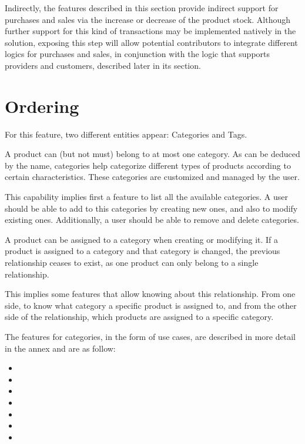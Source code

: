 Indirectly, the features described in this section provide indirect support for purchases and sales via the increase or decrease of the product stock. Although further support for this kind of transactions may be implemented natively in the solution, exposing this step will allow potential contributors to integrate different logics for purchases and sales, in conjunction with the logic that supports providers and customers, described later in its section.

\section{Ordering}
For this feature, two different entities appear: Categories and Tags. 

A product can (but not must) belong to at most one category. As can be deduced by the name, categories help categorize different types of products according to certain characteristics. These categories are customized and managed by the user.

This capability implies first a feature to list all the available categories. A user should be able to add to this categories by creating new ones, and also to modify existing ones. Additionally, a user should be able to remove and delete categories.

A product can be assigned to a category when creating or modifying it. If a product is assigned to a category and that category is changed, the previous relationship ceases to exist, as one product can only belong to a single relationship. 

This implies some features that allow knowing about this relationship. From one side, to know what category a specific product is assigned to, and from the other side of the relationship, which products are assigned to a specific category.

The features for categories, in the form of use cases, are described in more detail in the annex and are as follow:

\begin{itemize}
\item {}
\item {}
\item {}
\item {}
\item {}
\item {}
\item {}
\end{itemize}

